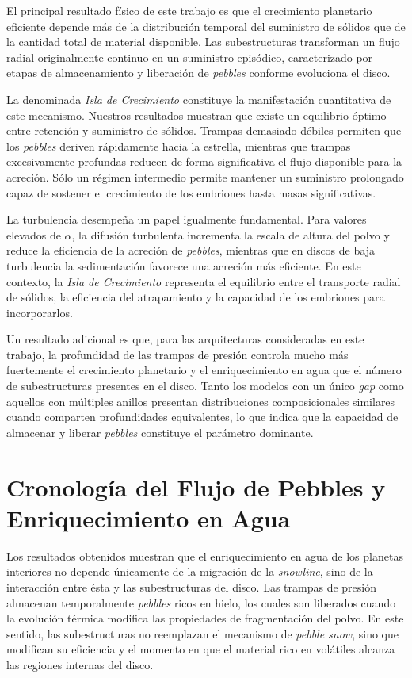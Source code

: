 El principal resultado físico de este trabajo es que el crecimiento planetario eficiente depende más de la distribución temporal del suministro de sólidos que de la cantidad total de material disponible. Las subestructuras transforman un flujo radial originalmente continuo en un suministro episódico, caracterizado por etapas de almacenamiento y liberación de \textit{pebbles} conforme evoluciona el disco.

La denominada \textit{Isla de Crecimiento} constituye la manifestación cuantitativa de este mecanismo. Nuestros resultados muestran que existe un equilibrio óptimo entre retención y suministro de sólidos. Trampas demasiado débiles permiten que los \textit{pebbles} deriven rápidamente hacia la estrella, mientras que trampas excesivamente profundas reducen de forma significativa el flujo disponible para la acreción. Sólo un régimen intermedio permite mantener un suministro prolongado capaz de sostener el crecimiento de los embriones hasta masas significativas.

La turbulencia desempeña un papel igualmente fundamental. Para valores elevados de $\alpha$, la difusión turbulenta incrementa la escala de altura del polvo y reduce la eficiencia de la acreción de \textit{pebbles}, mientras que en discos de baja turbulencia la sedimentación favorece una acreción más eficiente. En este contexto, la \textit{Isla de Crecimiento} representa el equilibrio entre el transporte radial de sólidos, la eficiencia del atrapamiento y la capacidad de los embriones para incorporarlos.

Un resultado adicional es que, para las arquitecturas consideradas en este trabajo, la profundidad de las trampas de presión controla mucho más fuertemente el crecimiento planetario y el enriquecimiento en agua que el número de subestructuras presentes en el disco. Tanto los modelos con un único \textit{gap} como aquellos con múltiples anillos presentan distribuciones composicionales similares cuando comparten profundidades equivalentes, lo que indica que la capacidad de almacenar y liberar \textit{pebbles} constituye el parámetro dominante.

\section{Cronología del Flujo de Pebbles y Enriquecimiento en Agua}

Los resultados obtenidos muestran que el enriquecimiento en agua de los planetas interiores no depende únicamente de la migración de la \textit{snowline}, sino de la interacción entre ésta y las subestructuras del disco. Las trampas de presión almacenan temporalmente \textit{pebbles} ricos en hielo, los cuales son liberados cuando la evolución térmica modifica las propiedades de fragmentación del polvo. En este sentido, las subestructuras no reemplazan el mecanismo de \textit{pebble snow}, sino que modifican su eficiencia y el momento en que el material rico en volátiles alcanza las regiones internas del disco.

